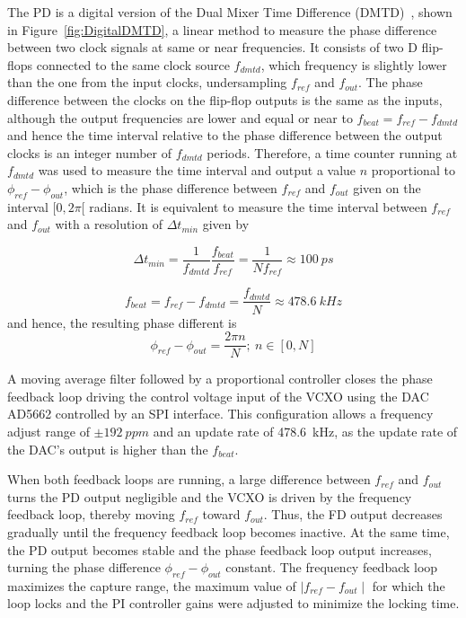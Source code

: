 \documentclass[a4paper,
               biblatex,      %
               ]{jacow}
\begin{document}
The PD is a digital version of the Dual Mixer Time Difference (DMTD)~\cite{allan1975picosecond}, shown in Figure~\ref{fig:DigitalDMTD}, a linear method to measure the phase difference between two clock signals at same or near frequencies. It consists of two D flip-flops connected to the same clock source $f_{dmtd}$, which frequency is slightly lower than the one from the input clocks, undersampling $f_{ref}$ and $f_{out}$. The phase difference between the clocks on the flip-flop outputs is the same as the inputs, although the output frequencies are lower and equal or near to $f_{beat}=f_{ref}-f_{dmtd}$ and hence the time interval relative to the phase difference between the output clocks is an integer number of $f_{dmtd}$ periods. Therefore, a time counter running at $f_{dmtd}$ was used to measure the time interval and output a value $n$ proportional to $\phi_{ref}-\phi_{out}$, which is the phase difference between $f_{ref}$ and $f_{out}$ given on the interval $[0,2\pi[$ radians. It is equivalent to measure the time interval between $f_{ref}$ and $f_{out}$ with a resolution of $\Delta t_{min}$ given by

\[\Delta t_{min} = \frac{1}{f_{dmtd}}\frac{f_{beat}}{f_{ref}} = \frac{1}{Nf_{ref}} \approx 100~ps\]

\[f_{beat} = f_{ref}-f_{dmtd} = \frac{f_{dmtd}}{N} \approx 478.6~kHz\]
and hence, the resulting phase different is
\[\phi_{ref}-\phi_{out} = \frac{2\pi n}{N};~n \in [0,N]\]

A moving average filter followed by a proportional controller closes the phase feedback loop driving the control voltage input of the VCXO using the DAC AD5662 controlled by an SPI interface. This configuration allows a frequency adjust range of $\pm192~ppm$ and an update rate of 478.6~kHz, as the update rate of the DAC's output is higher than the $f_{beat}$.

When both feedback loops are running, a large difference between $f_{ref}$ and $f_{out}$ turns the PD output negligible and the VCXO is driven by the frequency feedback loop, thereby moving $f_{ref}$ toward $f_{out}$. Thus, the FD output decreases gradually until the frequency feedback loop becomes inactive. At the same time, the PD output becomes stable and the phase feedback loop output increases, turning the phase difference $\phi_{ref}-\phi_{out}$ constant. The frequency feedback loop maximizes the capture range, the maximum value of ${\mid f_{ref}-f_{out} \mid}$ for which the loop locks and the PI controller gains were adjusted to minimize the locking time.
\end{document}
